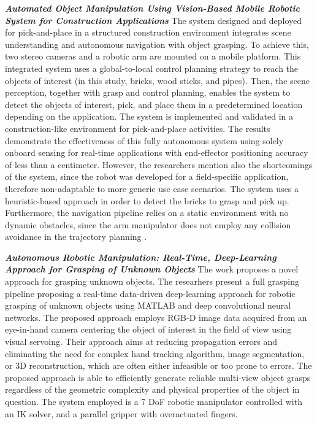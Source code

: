 \textbf{\textit{Automated Object Manipulation Using Vision-Based Mobile 
Robotic System for Construction Applications}} \quad
The system designed and deployed for pick-and-place in a structured construction environment
\cite{asadi2019construction} integrates scene understanding and autonomous navigation 
with object grasping. To achieve this, two stereo cameras and a robotic arm are mounted
on a mobile platform. This integrated system uses a global-to-local control planning strategy
to reach the objects of interest (in this study, bricks, wood sticks, and pipes). 
Then, the scene perception, together with grasp and control planning, enables the system
to detect the objects of interest, pick, and place them in a predetermined location depending
on the application.
The system is implemented and validated in a construction-like environment for pick-and-place
activities. The results demonstrate the effectiveness of this fully autonomous system 
using solely onboard sensing for real-time applications with end-effector positioning
accuracy of less than a centimeter.
However, the researchers mention also the shortcomings of the system, since the robot
was developed for a field-specific application, therefore non-adaptable to more generic
use case scenarios. The system uses a heuristic-based approach in order to detect the
bricks to grasp and pick up. Furthermore, the navigation pipeline relies on a static environment
with no dynamic obstacles, since the arm manipulator does not employ any collision avoidance
in the trajectory planning \cite{asadi2019construction}.


\textbf{\textit{Autonomous Robotic Manipulation: Real-Time, Deep-Learning
		Approach for Grasping of Unknown Objects}} \quad
The work \cite{sayour2022unknowngrasping} proposes a novel approach for grasping unknown objects.
The researhers present a full grasping pipeline proposing a real-time data-driven
deep-learning approach for robotic grasping of unknown objects using MATLAB and
deep convolutional neural networks. The proposed approach employs RGB-D image data
acquired from an eye-in-hand camera centering the object of interest in the field of
view using visual servoing. Their approach aims at reducing propagation errors
and eliminating the need for complex hand tracking algorithm, image segmentation,
or 3D reconstruction, which are often either infeasible or too prone to errors.
The proposed approach is able to efficiently generate reliable multi-view object grasps
regardless of the geometric complexity and physical properties of the object in question.
The system employed is a 7 DoF robotic manipulator controlled with an IK solver,
and a parallel gripper with overactuated fingers.

